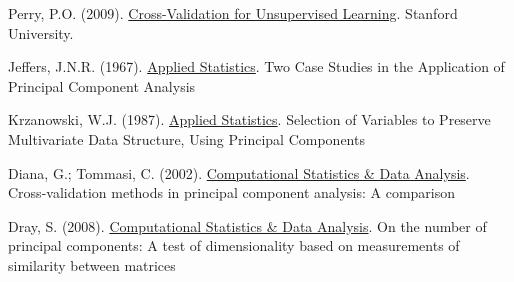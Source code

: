 \documentclass{article}
\begin{document}
\begin{thebibliography}{9}
    Perry, P.O. (2009). 
    \href{https://citeseerx.ist.psu.edu/document?repid=rep1&type=pdf&doi=0a2508a9fd89513ddf1c227274c8192993520692}{Cross-Validation for Unsupervised Learning}. 
    Stanford University.

    Jeffers, J.N.R. (1967).
    \href{https://www.jstor.org/stable/2985919}{Applied Statistics}.
    Two Case Studies in the Application of Principal Component Analysis

    Krzanowski, W.J. (1987).
    \href{https://www.tandfonline.com/doi/abs/10.1080/03610928708829385}{Applied Statistics}.
    Selection of Variables to Preserve Multivariate Data Structure, Using Principal Components 
    
    Diana, G.; Tommasi, C. (2002).
    \href{https://link.springer.com/article/10.1007/BF02511446}{Computational Statistics \& Data Analysis}.
    Cross-validation methods in principal component analysis: A comparison 

    Dray, S. (2008).
    \href{https://www.sciencedirect.com/science/article/pii/S0167947307002939}{Computational Statistics \& Data Analysis}.
    On the number of principal components: A test of dimensionality based on measurements of similarity between matrices

\end{thebibliography}
\end{document}
